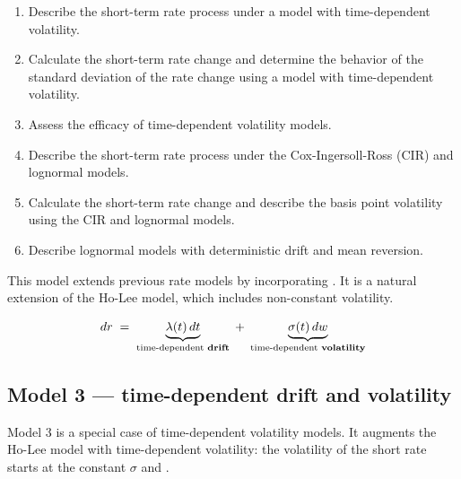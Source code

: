 
\begin{mrkeybox}[title={Learning objectives in this reading}]
\small
\begin{enumerate}[label=\textbf{\alph*.},leftmargin=1.7em]
\item Describe the short-term rate process under a model with time-dependent volatility.
\item Calculate the short-term rate change and determine the behavior of the standard deviation
      of the rate change using a model with time-dependent volatility.
\item Assess the efficacy of time-dependent volatility models.
\item Describe the short-term rate process under the Cox-Ingersoll-Ross (CIR) and lognormal
      models.
\item Calculate the short-term rate change and describe the basis point volatility using the CIR
      and lognormal models.
\item Describe lognormal models with deterministic drift and mean reversion.
\end{enumerate}
\end{mrkeybox}


This model extends previous rate models by incorporating . It is
a natural extension of the Ho-Lee model, which includes non-constant volatility.

\begin{mrfmlbox}
\[ dr \;=\; \underbrace{\lambda(t)\,dt}_{\text{time-dependent \textbf{drift}}}
   \;+\; \underbrace{\sigma(t)\,dw}_{\text{time-dependent \textbf{volatility}}} \]
\end{mrfmlbox}


\subsection{Model 3 --- time-dependent drift and volatility}
Model 3 is a special case of time-dependent volatility models. It augments the Ho-Lee model with
time-dependent volatility: the volatility of the short rate starts at the constant $\sigma$ and
.


